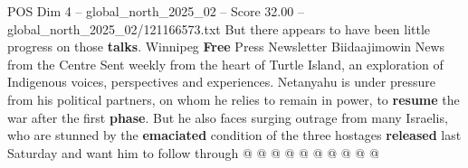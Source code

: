 \begin{textsample}{POS Dim 4 – global\_north\_2025\_02 – Score 32.00 – global\_north\_2025\_02/121166573.txt}
But there appears to have been little progress on those \textbf{talks}.
Winnipeg \textbf{Free} Press Newsletter Biidaajimowin News from the Centre Sent weekly from the heart of Turtle Island, an exploration of Indigenous voices, perspectives and experiences.
Netanyahu is under pressure from his political partners, on whom he relies to remain in power, to \textbf{resume} the war after the first \textbf{phase}.
But he also faces surging outrage from many Israelis, who are stunned by the \textbf{emaciated} condition of the three hostages \textbf{released} last Saturday and want him to follow through @ @ @ @ @ @ @ @ @ @

\end{textsample}
